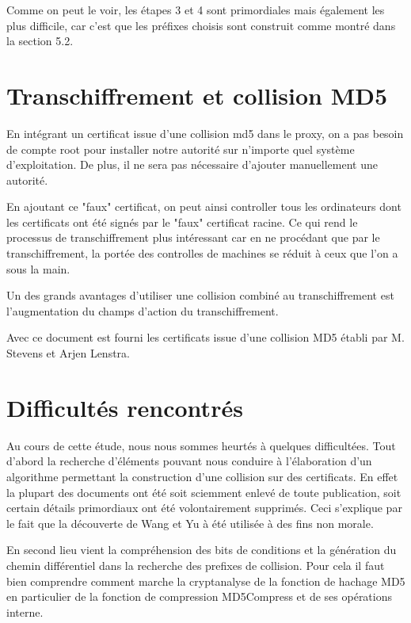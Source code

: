 \documentclass[a4paper,11pt,french]{article}
\begin{document}
Comme on peut le voir, les étapes 3 et 4 sont primordiales mais également les plus difficile, car c'est que les préfixes choisis sont construit comme montré dans la section 5.2.

\section{Transchiffrement et collision MD5}

En intégrant un certificat issue d'une collision md5 dans le proxy, on a pas besoin de compte root pour installer notre autorité sur n'importe quel système d'exploitation. De plus, il ne sera pas nécessaire d'ajouter manuellement une autorité. 

En ajoutant ce "faux" certificat, on peut ainsi controller tous les ordinateurs dont les certificats ont été signés par le "faux" certificat racine. Ce qui rend le processus de transchiffrement plus intéressant car en ne procédant que par le transchiffrement, la portée des controlles de machines se réduit à ceux que l'on a sous la main.

Un des grands avantages d'utiliser une collision combiné au transchiffrement est l'augmentation du champs d'action du transchiffrement. 

Avec ce document est fourni les certificats issue d'une collision MD5 établi par M. Stevens et Arjen Lenstra.


\section{Difficultés rencontrés}
Au cours de cette étude, nous nous sommes heurtés à quelques difficultées. Tout d'abord la recherche d'éléments pouvant nous conduire à l'élaboration d'un algorithme permettant la construction d'une collision sur des certificats. En effet la plupart des documents ont été soit sciemment enlevé de toute publication, soit certain détails primordiaux ont été volontairement supprimés. Ceci s'explique par le fait que la découverte de Wang et Yu à été utilisée à des fins non morale.

En second lieu vient la compréhension des bits de conditions et la génération du chemin différentiel dans la recherche des prefixes de collision. Pour cela il faut bien comprendre comment marche la cryptanalyse de la fonction de hachage MD5 en particulier de la fonction de compression MD5Compress et de ses opérations interne.
\end{document}
